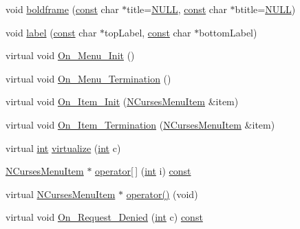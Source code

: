 \begin{DoxyCompactItemize}
\item 
void \hyperlink{class_n_curses_menu_a6b3305e0830003dad08d7a5bbb2d5c35}{boldframe} (\hyperlink{term__entry_8h_a57bd63ce7f9a353488880e3de6692d5a}{const} char $\ast$title=\hyperlink{internal_8h_a070d2ce7b6bb7e5c05602aa8c308d0c4}{N\-U\-L\-L}, \hyperlink{term__entry_8h_a57bd63ce7f9a353488880e3de6692d5a}{const} char $\ast$btitle=\hyperlink{internal_8h_a070d2ce7b6bb7e5c05602aa8c308d0c4}{N\-U\-L\-L})
\item 
void \hyperlink{class_n_curses_menu_ab15f1ca8980fa1455465485018ed32b6}{label} (\hyperlink{term__entry_8h_a57bd63ce7f9a353488880e3de6692d5a}{const} char $\ast$top\-Label, \hyperlink{term__entry_8h_a57bd63ce7f9a353488880e3de6692d5a}{const} char $\ast$bottom\-Label)
\item 
virtual void \hyperlink{class_n_curses_menu_a1a57fcc6fcd544808935a527ee725550}{On\-\_\-\-Menu\-\_\-\-Init} ()
\item 
virtual void \hyperlink{class_n_curses_menu_a61d5f9fb3acc6f6a85e52c62e3fe0184}{On\-\_\-\-Menu\-\_\-\-Termination} ()
\item 
virtual void \hyperlink{class_n_curses_menu_ad6e1cea2c5375cf542a182238a7f7148}{On\-\_\-\-Item\-\_\-\-Init} (\hyperlink{class_n_curses_menu_item}{N\-Curses\-Menu\-Item} \&item)
\item 
virtual void \hyperlink{class_n_curses_menu_a5403522bfb08e73e52053ca6856c8437}{On\-\_\-\-Item\-\_\-\-Termination} (\hyperlink{class_n_curses_menu_item}{N\-Curses\-Menu\-Item} \&item)
\item 
virtual \hyperlink{term__entry_8h_ad65b480f8c8270356b45a9890f6499ae}{int} \hyperlink{class_n_curses_menu_a164aae52af24281b1998ecea3290d97f}{virtualize} (\hyperlink{term__entry_8h_ad65b480f8c8270356b45a9890f6499ae}{int} c)
\item 
\hyperlink{class_n_curses_menu_item}{N\-Curses\-Menu\-Item} $\ast$ \hyperlink{class_n_curses_menu_a26f187ce8579a40c9c7e13f49a8a9efc}{operator\mbox{[}$\,$\mbox{]}} (\hyperlink{term__entry_8h_ad65b480f8c8270356b45a9890f6499ae}{int} i) \hyperlink{term__entry_8h_a57bd63ce7f9a353488880e3de6692d5a}{const} 
\item 
virtual \hyperlink{class_n_curses_menu_item}{N\-Curses\-Menu\-Item} $\ast$ \hyperlink{class_n_curses_menu_a7151ce083420515bf0449c38eb58eb25}{operator()} (void)
\item 
virtual void \hyperlink{class_n_curses_menu_a3aa7a0e997d9f82029ddc6c5caa70cda}{On\-\_\-\-Request\-\_\-\-Denied} (\hyperlink{term__entry_8h_ad65b480f8c8270356b45a9890f6499ae}{int} c) \hyperlink{term__entry_8h_a57bd63ce7f9a353488880e3de6692d5a}{const} 

\end{DoxyCompactItemize}
